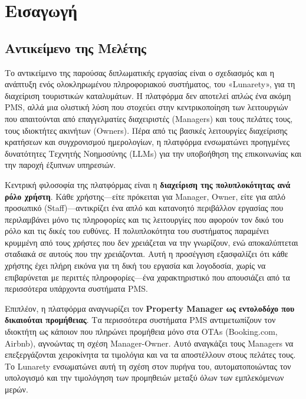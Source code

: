 \documentclass[
	12pt, %
	oneside, %
	greek,
	onehalfspacing, %
	liststotoc, %
	toctotoc, %
	parskip, %
	headsepline, %
]{MastersDoctoralThesis} %
\begin{document}

\chapter{Εισαγωγή}
\label{chap:introduction}

\section{Αντικείμενο της Μελέτης}
\label{sec:subject}

Το αντικείμενο της παρούσας διπλωματικής εργασίας είναι ο σχεδιασμός και η ανάπτυξη ενός ολοκληρωμένου πληροφοριακού συστήματος, του «Lunarety», για τη διαχείριση τουριστικών καταλυμάτων. Η πλατφόρμα δεν αποτελεί απλώς ένα ακόμη PMS, αλλά μια ολιστική λύση που στοχεύει στην κεντρικοποίηση των λειτουργιών που απαιτούνται από επαγγελματίες διαχειριστές (Managers) και τους πελάτες τους, τους ιδιοκτήτες ακινήτων (Owners). Πέρα από τις βασικές λειτουργίες διαχείρισης κρατήσεων και συγχρονισμού ημερολογίων, η πλατφόρμα ενσωματώνει προηγμένες δυνατότητες Τεχνητής Νοημοσύνης (LLMs) για την υποβοήθηση της επικοινωνίας και την παροχή έξυπνων υπηρεσιών.

Κεντρική φιλοσοφία της πλατφόρμας είναι η \textbf{διαχείριση της πολυπλοκότητας ανά ρόλο χρήστη}. Κάθε χρήστης---είτε πρόκειται για Manager, Owner, είτε για απλό προσωπικό (Staff)---αντικρίζει ένα απλό και κατανοητό περιβάλλον εργασίας που περιλαμβάνει μόνο τις πληροφορίες και τις λειτουργίες που αφορούν τον δικό του ρόλο και τις δικές του ευθύνες. Η πολυπλοκότητα του συστήματος παραμένει κρυμμένη από τους χρήστες που δεν χρειάζεται να την γνωρίζουν, ενώ αποκαλύπτεται σταδιακά σε αυτούς που την χρειάζονται. Αυτή η προσέγγιση εξασφαλίζει ότι κάθε χρήστης έχει πλήρη εικόνα για τη δική του εργασία και λογοδοσία, χωρίς να επιβαρύνεται με περιττές πληροφορίες---ένα χαρακτηριστικό που απουσιάζει από τα περισσότερα υπάρχοντα συστήματα PMS.

Επιπλέον, η πλατφόρμα αναγνωρίζει τον \textbf{Property Manager ως εντολοδόχο που δικαιούται προμήθειας}. Τα περισσότερα συστήματα PMS αντιμετωπίζουν τον ιδιοκτήτη ως κάποιον που πληρώνει προμήθεια μόνο στα OTAs (Booking.com, Airbnb), αγνοώντας τη σχέση Manager-Owner. Αυτό αναγκάζει τους Managers να επεξεργάζονται χειροκίνητα τα τιμολόγια και να τα αποστέλλουν στους πελάτες τους. Το Lunarety ενσωματώνει αυτή τη σχέση στον πυρήνα του, αυτοματοποιώντας τον υπολογισμό και την τιμολόγηση των προμηθειών μεταξύ όλων των εμπλεκόμενων μερών.
\end{document}
